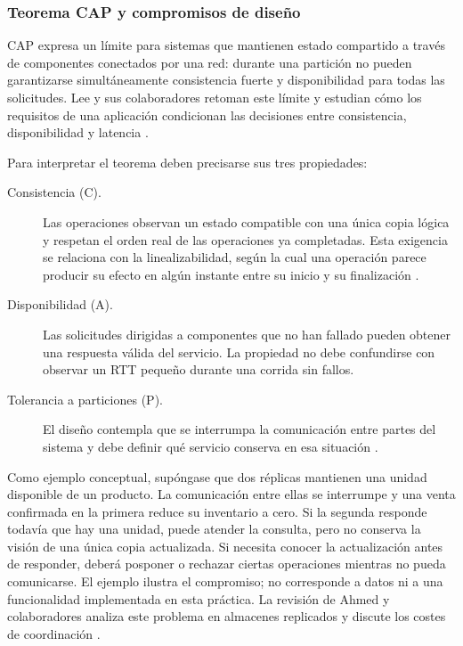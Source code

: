 \subsubsection{Teorema CAP y compromisos de diseño}

CAP expresa un límite para sistemas que mantienen estado compartido a través de
componentes conectados por una red: durante una partición no pueden garantizarse
simultáneamente consistencia fuerte y disponibilidad para todas las solicitudes.
Lee y sus colaboradores retoman este límite y estudian cómo los requisitos de una
aplicación condicionan las decisiones entre consistencia, disponibilidad y latencia
\cite[pp.~138:2--138:3]{belinda_lee2023_cap}.

Para interpretar el teorema deben precisarse sus tres propiedades:
\begin{description}
    \item[Consistencia (C).] Las operaciones observan un estado compatible con una
    única copia lógica y respetan el orden real de las operaciones ya completadas.
    Esta exigencia se relaciona con la linealizabilidad, según la cual una operación
    parece producir su efecto en algún instante entre su inicio y su finalización
    \cite[p.~400]{belinda_vansteen2023_distributed}.
    \item[Disponibilidad (A).] Las solicitudes dirigidas a componentes que no han
    fallado pueden obtener una respuesta válida del servicio. La propiedad no debe
    confundirse con observar un RTT pequeño durante una corrida sin fallos.
    \item[Tolerancia a particiones (P).] El diseño contempla que se interrumpa la
    comunicación entre partes del sistema y debe definir qué servicio conserva
    en esa situación \cite[p.~138:2]{belinda_lee2023_cap}.
\end{description}

Como ejemplo conceptual, supóngase que dos réplicas mantienen una unidad disponible
de un producto. La comunicación entre ellas se interrumpe y una venta confirmada
en la primera reduce su inventario a cero. Si la segunda responde todavía que hay
una unidad, puede atender la consulta, pero no conserva la visión de una única
copia actualizada. Si necesita conocer la actualización antes de responder, deberá
posponer o rechazar ciertas operaciones mientras no pueda comunicarse. El ejemplo
ilustra el compromiso; no corresponde a datos ni a una funcionalidad implementada
en esta práctica. La revisión de Ahmed y colaboradores analiza este problema en
almacenes replicados y discute los costes de coordinación
\cite[pp.~172--173]{belinda_ahmed2023_consistency}.

